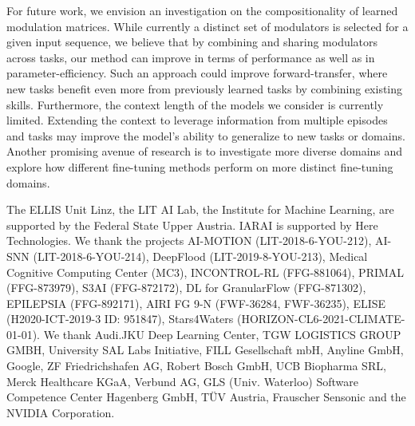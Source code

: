\documentclass{article}
\begin{document}
For future work, we envision an investigation on the compositionality of learned modulation matrices.
While currently a distinct set of modulators is selected for a given input sequence, we believe that by combining and sharing modulators across tasks, our method can improve in terms of performance as well as in parameter-efficiency. 
Such an approach could improve forward-transfer, where new tasks benefit even more from previously learned tasks by combining existing skills. 
Furthermore, the context length of the models we consider is currently limited. Extending the context to leverage information from multiple episodes and tasks may improve the model's ability to generalize to new tasks or domains. 
Another promising avenue of research is to investigate more diverse domains and explore how different fine-tuning methods perform on more distinct fine-tuning domains.


\begin{ack}
The ELLIS Unit Linz, the LIT AI Lab, the Institute for Machine Learning, are supported by the Federal State Upper Austria. IARAI is supported by Here Technologies. We thank the projects AI-MOTION (LIT-2018-6-YOU-212), AI-SNN (LIT-2018-6-YOU-214), DeepFlood (LIT-2019-8-YOU-213), Medical Cognitive Computing Center (MC3), INCONTROL-RL (FFG-881064), PRIMAL (FFG-873979), S3AI (FFG-872172), DL for GranularFlow (FFG-871302), EPILEPSIA (FFG-892171), AIRI FG 9-N (FWF-36284, FWF-36235), ELISE (H2020-ICT-2019-3 ID: 951847), Stars4Waters (HORIZON-CL6-2021-CLIMATE-01-01). We thank Audi.JKU Deep Learning Center, TGW LOGISTICS GROUP GMBH, University SAL Labs Initiative, FILL Gesellschaft mbH, Anyline GmbH, Google, ZF Friedrichshafen AG, Robert Bosch GmbH, UCB Biopharma SRL, Merck Healthcare KGaA, Verbund AG, GLS (Univ. Waterloo) Software Competence Center Hagenberg GmbH, T\"{U}V Austria, Frauscher Sensonic and the NVIDIA Corporation.
\end{ack}





\end{document}
